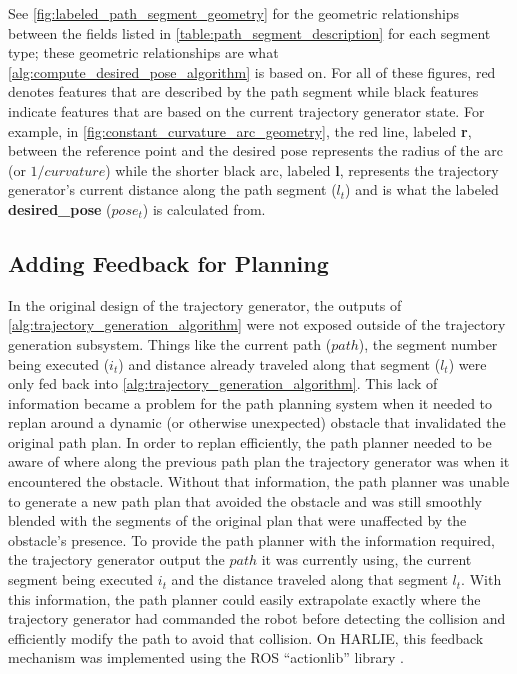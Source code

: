 See \autoref{fig:labeled_path_segment_geometry} for the geometric relationships between the fields listed in \autoref{table:path_segment_description} for each segment type; these geometric relationships are what \autoref{alg:compute_desired_pose_algorithm} is based on. For all of these figures, red denotes features that are described by the path segment while black features indicate features that are based on the current trajectory generator state. For example, in \autoref{fig:constant_curvature_arc_geometry}, the red line, labeled \textbf{r}, between the reference point and the desired pose represents the radius of the arc (or $1/curvature$) while the shorter black arc, labeled \textbf{l}, represents the trajectory generator's current distance along the path segment ($l_t$) and is what the labeled \textbf{desired\_pose} ($pose_t$) is calculated from.

\subsection{Adding Feedback for Planning}\label{subsec:trajectory_generation_actionlib}

In the original design of the trajectory generator, the outputs of \autoref{alg:trajectory_generation_algorithm} were not exposed outside of the trajectory generation subsystem. Things like the current path ($path$), the segment number being executed ($i_t$) and distance already traveled along that segment ($l_t$) were only fed back into \autoref{alg:trajectory_generation_algorithm}. This lack of information became a problem for the path planning system when it needed to replan around a dynamic (or otherwise unexpected) obstacle that invalidated the original path plan. In order to replan efficiently, the path planner needed to be aware of where along the previous path plan the trajectory generator was when it encountered the obstacle. Without that information, the path planner was unable to generate a new path plan that avoided the obstacle and was still smoothly blended with the segments of the original plan that were unaffected by the obstacle's presence. To provide the path planner with the information required, the trajectory generator output the $path$ it was currently using, the current segment being executed $i_t$ and the distance traveled along that segment $l_t$. With this information, the path planner could easily extrapolate exactly where the trajectory generator had commanded the robot before detecting the collision and efficiently modify the path to avoid that collision. On HARLIE, this feedback mechanism was implemented using the ROS ``actionlib'' library \autocite{ActionLibWiki}.

